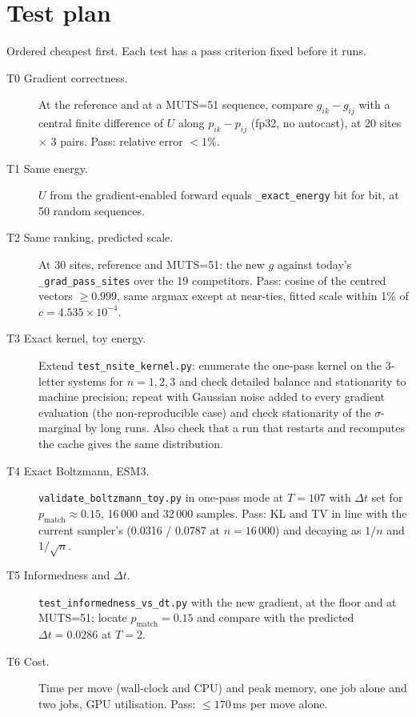 \documentclass[11pt,a4paper]{article}
\newcommand{\dt}{\Delta t}
\newcommand{\file}[1]{\texttt{#1}}
\begin{document}
\section{Test plan}\label{sec:tests}
Ordered cheapest first. Each test has a pass criterion fixed before it runs.
\begin{description}
  \item[T0 Gradient correctness.] At the reference and at a MUTS=51 sequence,
        compare $g_{ik}-g_{ij}$ with a central finite difference of $U$ along
        $p_{ik}-p_{ij}$ (fp32, no autocast), at 20 sites $\times$ 3 pairs.
        Pass: relative error $<1\%$.
  \item[T1 Same energy.] $U$ from the gradient-enabled forward equals
        \texttt{\_exact\_energy} bit for bit, at 50 random sequences.
  \item[T2 Same ranking, predicted scale.] At 30 sites, reference and MUTS=51:
        the new $g$ against today's \texttt{\_grad\_pass\_sites} over the 19
        competitors. Pass: cosine of the centred vectors $\ge0.999$, same
        argmax except at near-ties, fitted scale within 1\% of
        $c=4.535\times10^{-4}$.
  \item[T3 Exact kernel, toy energy.] Extend \file{test\_nsite\_kernel.py}:
        enumerate the one-pass kernel on the 3-letter systems for
        $n=1,2,3$ and check detailed balance and stationarity to machine
        precision; repeat with Gaussian noise added to every gradient
        evaluation (the non-reproducible case) and check stationarity of the
        $\sigma$-marginal by long runs. Also check that a run that restarts and
        recomputes the cache gives the same distribution.
  \item[T4 Exact Boltzmann, ESM3.] \file{validate\_boltzmann\_toy.py} in
        one-pass mode at $T=107$ with $\dt$ set for $p_{\mathrm{match}}\approx0.15$,
        16\,000 and 32\,000 samples. Pass: KL and TV in line with the current
        sampler's (0.0316 / 0.0787 at $n=16\,000$) and decaying as $1/n$ and
        $1/\sqrt n$.
  \item[T5 Informedness and $\dt$.] \file{test\_informedness\_vs\_dt.py} with the
        new gradient, at the floor and at MUTS=51; locate
        $p_{\mathrm{match}}=0.15$ and compare with the predicted $\dt=0.0286$ at
        $T=2$.
  \item[T6 Cost.] Time per move (wall-clock and CPU) and peak memory, one job
        alone and two jobs, GPU utilisation. Pass: $\le170$\,ms per move alone.

\end{description}
\end{document}
